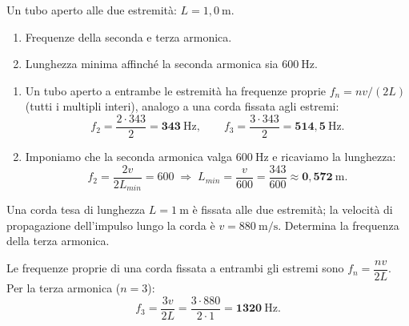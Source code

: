 \begin{question}[ID=6.4, subtitle={Tubo aperto — seconda e terza armonica, lunghezza minima}, tags={tubo aperto, armoniche}, difficulty=media]
Un tubo aperto alle due estremità: $L = 1{,}0\ \mathrm{m}$.
\begin{enumerate}
\item Frequenze della seconda e terza armonica.
\item Lunghezza minima affinché la seconda armonica sia $600\ \mathrm{Hz}$.
\end{enumerate}
\begin{solution}
\begin{enumerate}
\item Un tubo aperto a entrambe le estremità ha frequenze proprie $f_n = nv/(2L)$ (tutti i multipli interi), analogo a una corda fissata agli estremi:
\[
f_2 = \frac{2\cdot 343}{2} = \mathbf{343\ \mathrm{Hz}}, \qquad f_3 = \frac{3\cdot 343}{2} = \mathbf{514{,}5\ \mathrm{Hz}}.
\]
\item Imponiamo che la seconda armonica valga $600\ \mathrm{Hz}$ e ricaviamo la lunghezza:
\[
f_2 = \frac{2v}{2L_{min}} = 600 \;\Rightarrow\; L_{min} = \frac{v}{600} = \frac{343}{600} \approx \mathbf{0{,}572\ \mathrm{m}}.
\]
\end{enumerate}
\end{solution}
\end{question}

\begin{question}[ID=6.5, subtitle={Terza armonica di una corda tesa con v = 880 m/s}, tags={onde stazionarie, armoniche}, difficulty=facile]
Una corda tesa di lunghezza $L = 1\ \mathrm{m}$ è fissata alle due estremità; la velocità di propagazione dell'impulso lungo la corda è $v = 880\ \mathrm{m/s}$. Determina la frequenza della terza armonica.
\begin{solution}
Le frequenze proprie di una corda fissata a entrambi gli estremi sono $f_n = \dfrac{nv}{2L}$. Per la terza armonica ($n = 3$):
\[
f_3 = \frac{3v}{2L} = \frac{3\cdot 880}{2\cdot 1} = \mathbf{1320\ \mathrm{Hz}}.
\]
\end{solution}
\end{question}




